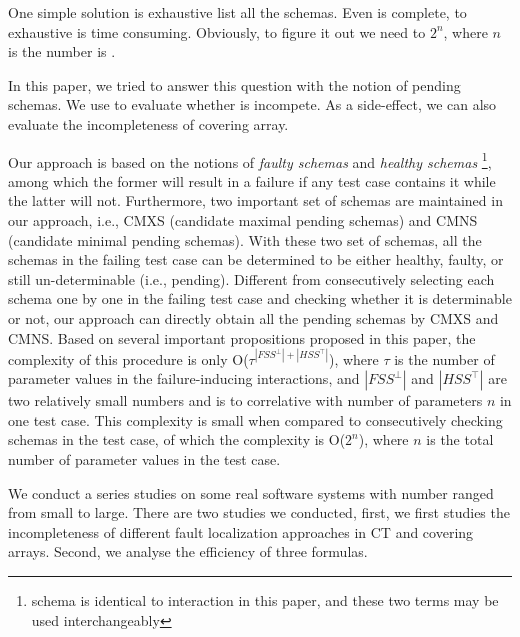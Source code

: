 One simple solution is exhaustive list all the schemas. Even is complete, to exhaustive is time consuming. Obviously, to figure it out we need to $2^{n}$, where $n$ is the number is .

In this paper, we tried to answer this question with the notion of pending schemas. We use to evaluate whether is incompete. As a side-effect, we can also evaluate the incompleteness of covering array.

Our approach is based on the notions of \emph{faulty schemas} and \emph{healthy schemas} \footnote{schema is identical to interaction in this paper, and these two terms may be used interchangeably}, among which the former will result in a failure if any test case contains it while the latter will not. Furthermore, two important set of schemas are maintained in our approach, i.e., CMXS (candidate maximal pending schemas) and CMNS (candidate minimal pending schemas). With these two set of schemas, all the schemas in the failing test case can be determined to be either healthy, faulty, or still un-determinable (i.e., pending). Different from consecutively selecting each schema one by one in the failing test case and checking whether it is determinable or not, our approach can directly obtain all the pending schemas by CMXS and CMNS. Based on several important propositions proposed in this paper, the complexity of this procedure is only O($ \tau^{|FSS^{\bot}|+|HSS^{\top}|}$), where $\tau$ is the number of parameter values in the failure-inducing interactions, and $|FSS^{\bot}|$ and $|HSS^{\top}|$ are two relatively small numbers and is to correlative with number of parameters $n$ in one test case. This complexity is small when compared to consecutively checking schemas in the test case, of which the complexity is O($2^{n}$), where $n$ is the total number of parameter values in the test case.

We conduct a series studies on some real software systems with number ranged from small to large. There are two studies we conducted, first, we first studies the incompleteness of different fault localization approaches in CT and covering arrays. Second, we analyse the efficiency of three formulas.

